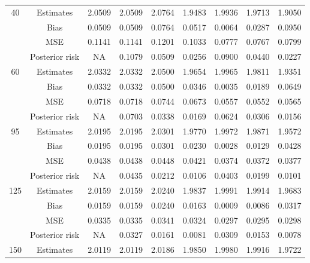 \documentclass[a4paper,12pt]{report}
\begin{document}
\begin{minipage}{\linewidth}
{\begin{tabular}{|c|c|c|c|c|c|c|c|c|}
			40&		Estimates      &2.0509 &2.0509 &2.0764 &1.9483 &1.9936 &1.9713 &1.9050 \\
			&Bias           &0.0509 &0.0509 &0.0764 &0.0517 &0.0064 &0.0287 &0.0950\\
			&MSE            &0.1141 &0.1141 &0.1201 &0.1033 &0.0777 &0.0767 &0.0799\\
			&Posterior risk    &NA &0.1079 &0.0509 &0.0256 &0.0900 &0.0440 &0.0227 \\ \hline
			60&		Estimates      &2.0332 &2.0332 &2.0500 &1.9654 &1.9965 &1.9811 &1.9351 \\
			&Bias           &0.0332 &0.0332 &0.0500 &0.0346 &0.0035 &0.0189 &0.0649 \\
			&MSE            &0.0718 &0.0718 &0.0744 &0.0673 &0.0557 &0.0552 &0.0565 \\
			&Posterior risk    &NA &0.0703 &0.0338 &0.0169 &0.0624 &0.0306 &0.0156 \\ \hline
			95		&Estimates      &2.0195 &2.0195 &2.0301 &1.9770 &1.9972 &1.9871 &1.9572 \\
			&Bias           &0.0195 &0.0195 &0.0301 &0.0230 &0.0028 &0.0129 &0.0428 \\
			&MSE            &0.0438 &0.0438 &0.0448 &0.0421 &0.0374 &0.0372 &0.0377 \\
			&Posterior risk    &NA &0.0435 &0.0212 &0.0106 &0.0403 &0.0199 &0.0101 \\ \hline
			125		&Estimates      &2.0159 &2.0159 &2.0240 &1.9837 &1.9991 &1.9914 &1.9683 \\
			&Bias           &0.0159 &0.0159 &0.0240 &0.0163 &0.0009 &0.0086 &0.0317 \\
			&MSE            &0.0335 &0.0335 &0.0341 &0.0324 &0.0297 &0.0295 &0.0298 \\
			&Posterior risk    &NA &0.0327 &0.0161 &0.0081 &0.0309 &0.0153 &0.0078 \\ \hline
			150&	Estimates      &2.0119 &2.0119 &2.0186 &1.9850 &1.9980 &1.9916 &1.9722 \\

\end{tabular}}
\end{minipage}
\end{document}
